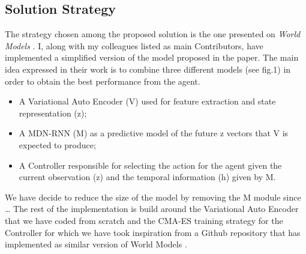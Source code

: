 \documentclass[10pt,a4paper]{article}
\begin{document}
\subsection{Solution Strategy}
The strategy chosen among the proposed solution is the one presented on \textit{World Models} \cite{DBLP:journals/corr/abs-1803-10122}. I, along with my colleagues listed as main Contributors, have implemented a simplified version of the model proposed in the paper. The main idea expressed in their work is to combine three different models (see fig.1) in order to obtain the best performance from the agent. 
\begin{itemize}
    \item A Variational Auto Encoder (V) used for feature extraction and state representation (z);
    \item A MDN-RNN (M) as a predictive model of the future z vectors that V is expected to produce;
    \item A Controller responsible for selecting the action for the agent given the current observation (z) and the temporal information (h) given by M.
\end{itemize}
We have decide to reduce the size of the model by removing the M module since \dots
The rest of the implementation is build around the Variational Auto Encoder that we have coded from scratch and the CMA-ES training strategy for the Controller for which we have took inspiration from a Github repository that has implemented as similar version of World Models \cite{ctallec-wm}.  

\newpage
\end{document}
